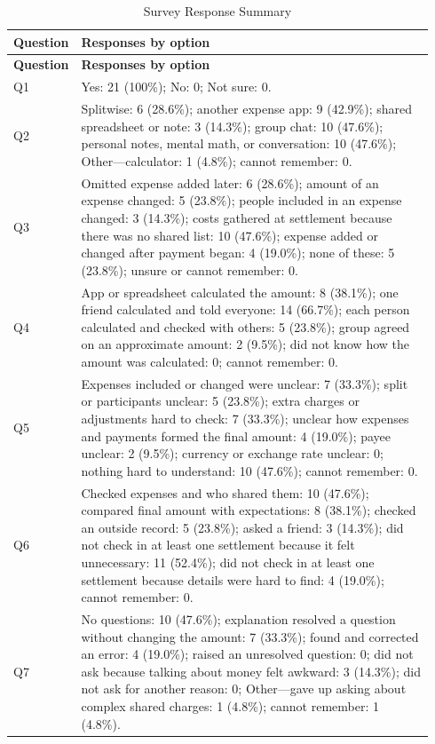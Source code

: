 {\footnotesize
\setlength{\tabcolsep}{3pt}
\renewcommand{\arraystretch}{1.17}
\begin{longtable}{@{}>{\raggedright\arraybackslash}p{0.10\linewidth}>{\raggedright\arraybackslash}p{0.84\linewidth}@{}}
\caption{Survey Response Summary}\label{tab:survey-response-summary}\\
\toprule[0.5pt]
\textbf{Question} & \textbf{Responses by option} \\
\midrule
\endfirsthead
\toprule[0.5pt]
\textbf{Question} & \textbf{Responses by option} \\
\midrule
\endhead
\endfoot
\bottomrule
\endlastfoot
Q1 & Yes: 21 (100\%); No: 0; Not sure: 0. \\
\midrule
Q2 & Splitwise: 6 (28.6\%); another expense app: 9 (42.9\%); shared spreadsheet or note: 3 (14.3\%); group chat: 10 (47.6\%); personal notes, mental math, or conversation: 10 (47.6\%); Other—calculator: 1 (4.8\%); cannot remember: 0. \\
\midrule
Q3 & Omitted expense added later: 6 (28.6\%); amount of an expense changed: 5 (23.8\%); people included in an expense changed: 3 (14.3\%); costs gathered at settlement because there was no shared list: 10 (47.6\%); expense added or changed after payment began: 4 (19.0\%); none of these: 5 (23.8\%); unsure or cannot remember: 0. \\
\midrule
Q4 & App or spreadsheet calculated the amount: 8 (38.1\%); one friend calculated and told everyone: 14 (66.7\%); each person calculated and checked with others: 5 (23.8\%); group agreed on an approximate amount: 2 (9.5\%); did not know how the amount was calculated: 0; cannot remember: 0. \\
\midrule
Q5 & Expenses included or changed were unclear: 7 (33.3\%); split or participants unclear: 5 (23.8\%); extra charges or adjustments hard to check: 7 (33.3\%); unclear how expenses and payments formed the final amount: 4 (19.0\%); payee unclear: 2 (9.5\%); currency or exchange rate unclear: 0; nothing hard to understand: 10 (47.6\%); cannot remember: 0. \\
\midrule
Q6 & Checked expenses and who shared them: 10 (47.6\%); compared final amount with expectations: 8 (38.1\%); checked an outside record: 5 (23.8\%); asked a friend: 3 (14.3\%); did not check in at least one settlement because it felt unnecessary: 11 (52.4\%); did not check in at least one settlement because details were hard to find: 4 (19.0\%); cannot remember: 0. \\
\midrule
Q7 & No questions: 10 (47.6\%); explanation resolved a question without changing the amount: 7 (33.3\%); found and corrected an error: 4 (19.0\%); raised an unresolved question: 0; did not ask because talking about money felt awkward: 3 (14.3\%); did not ask for another reason: 0; Other—gave up asking about complex shared charges: 1 (4.8\%); cannot remember: 1 (4.8\%). \\

\end{longtable}}
